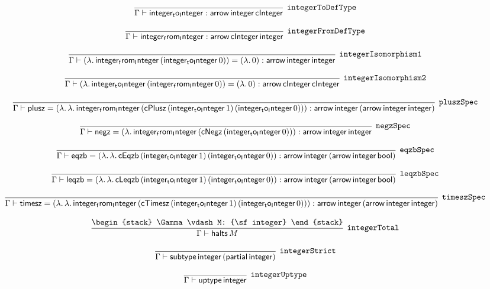 \[
\infer[{\tt integerToDefType}]{\Gamma \vdash {\sf integer_to_Integer}: {\sf arrow}\,{\sf integer}\,{\sf cInteger}}{}
\]

\[
\infer[{\tt integerFromDefType}]{\Gamma \vdash {\sf integer_from_Integer}: {\sf arrow}\,{\sf cInteger}\,{\sf integer}}{}
\]

\[
\infer[{\tt integerIsomorphism1}]{\Gamma \vdash (\lambda .\,{\sf integer_from_Integer}\,({\sf integer_to_Integer}\,0))= (\lambda .\,0): {\sf arrow}\,{\sf integer}\,{\sf integer}}{}
\]

\[
\infer[{\tt integerIsomorphism2}]{\Gamma \vdash (\lambda .\,{\sf integer_to_Integer}\,({\sf integer_from_Integer}\,0))= (\lambda .\,0): {\sf arrow}\,{\sf cInteger}\,{\sf cInteger}}{}
\]

\[
\infer[{\tt pluszSpec}]{\Gamma \vdash {\sf plusz}= (\lambda .\,\lambda .\,{\sf integer_from_Integer}\,({\sf cPlusz}\,({\sf integer_to_Integer}\,1)\,({\sf integer_to_Integer}\,0))): {\sf arrow}\,{\sf integer}\,({\sf arrow}\,{\sf integer}\,{\sf integer})}{}
\]

\[
\infer[{\tt negzSpec}]{\Gamma \vdash {\sf negz}= (\lambda .\,{\sf integer_from_Integer}\,({\sf cNegz}\,({\sf integer_to_Integer}\,0))): {\sf arrow}\,{\sf integer}\,{\sf integer}}{}
\]

\[
\infer[{\tt eqzbSpec}]{\Gamma \vdash {\sf eqzb}= (\lambda .\,\lambda .\,{\sf cEqzb}\,({\sf integer_to_Integer}\,1)\,({\sf integer_to_Integer}\,0)): {\sf arrow}\,{\sf integer}\,({\sf arrow}\,{\sf integer}\,{\sf bool})}{}
\]

\[
\infer[{\tt leqzbSpec}]{\Gamma \vdash {\sf leqzb}= (\lambda .\,\lambda .\,{\sf cLeqzb}\,({\sf integer_to_Integer}\,1)\,({\sf integer_to_Integer}\,0)): {\sf arrow}\,{\sf integer}\,({\sf arrow}\,{\sf integer}\,{\sf bool})}{}
\]

\[
\infer[{\tt timeszSpec}]{\Gamma \vdash {\sf timesz}= (\lambda .\,\lambda .\,{\sf integer_from_Integer}\,({\sf cTimesz}\,({\sf integer_to_Integer}\,1)\,({\sf integer_to_Integer}\,0))): {\sf arrow}\,{\sf integer}\,({\sf arrow}\,{\sf integer}\,{\sf integer})}{}
\]

\[
\infer[{\tt integerTotal}]{\Gamma \vdash {\sf halts}\,M}{
\begin{stack}
\Gamma \vdash M: {\sf integer}
\end{stack}}
\]

\[
\infer[{\tt integerStrict}]{\Gamma \vdash {\sf subtype}\,{\sf integer}\,({\sf partial}\,{\sf integer})}{}
\]

\[
\infer[{\tt integerUptype}]{\Gamma \vdash {\sf uptype}\,{\sf integer}}{}
\]

